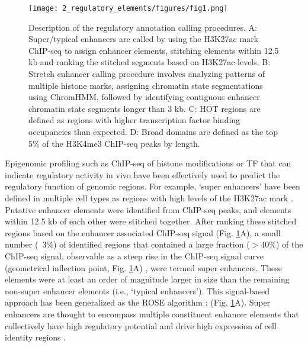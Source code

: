 \begin{figure}
    \centering
    \texttt{[image: 2\_regulatory\_elements/figures/fig1.png]}
    \caption[Description of the regulatory annotation calling procedures]{Description of the regulatory annotation calling procedures. A: Super/typical enhancers are called by using the H3K27ac mark ChIP-seq to assign enhancer elements, stitching elements within 12.5 kb and ranking the stitched segments based on H3K27ac levels. B: Stretch enhancer calling procedure involves analyzing patterns of multiple histone marks, assigning chromatin state segmentations using ChromHMM, followed by identifying contiguous enhancer chromatin state segments longer than 3 kb. C: HOT regions are defined as regions with higher transcription factor binding occupancies than expected. D: Broad domains are defined as the top 5\% of the H3K4me3 ChIP-seq peaks by length.}
    \label{fig:c1_f1}
\end{figure}

Epigenomic profiling such as \ac{ChIP-seq} of histone modifications or \ac{TF} that can indicate regulatory activity in vivo have been effectively used to predict the regulatory function of genomic regions. For example, ‘super enhancers’ have been defined in multiple cell types as regions with high levels of the \ac{H3K27ac} mark \cite{hniszSuperEnhancersControlCell2013}. Putative enhancer elements were identified from ChIP-seq peaks, and elements within 12.5 kb of each other were stitched together. After ranking these stitched regions based on the enhancer associated ChIP-seq signal (Fig. \ref{fig:c1_f1}A), a small number (~3\%) of identified regions that contained a large fraction ($>$40\%) of the ChIP-seq signal, observable as a steep rise in the ChIP-seq signal curve (geometrical inflection point, Fig. \ref{fig:c1_f1}A) \cite{whyteMasterTranscriptionFactors2013}, were termed super enhancers. These elements were at least an order of magnitude larger in size than the remaining non-super enhancer elements (i.e., ‘typical enhancers’). This signal-based approach has been generalized as the \ac{ROSE} algorithm \cite{lovenSelectiveInhibitionTumor2013}; \cite{whyteMasterTranscriptionFactors2013} (Fig. \ref{fig:c1_f1}A). Super enhancers are thought to encompass multiple constituent enhancer elements that collectively have high regulatory potential and drive high expression of cell identity regions \cite{whyteMasterTranscriptionFactors2013, hniszSuperEnhancersControlCell2013}. \\

